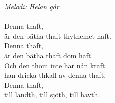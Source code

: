 {\footnotesize\textit{Melodi: Helan går}}\\
\\
Denna thaft,\\
är den bätha thaft thythemet haft.\\
Denna thaft,\\
är den bätha thaft dom haft.\\
Och den thom inte har nån kraft\\
han dricka thkall av denna thaft.\\
Denna thaft,\\
till landth, till sjöth, till havth.
